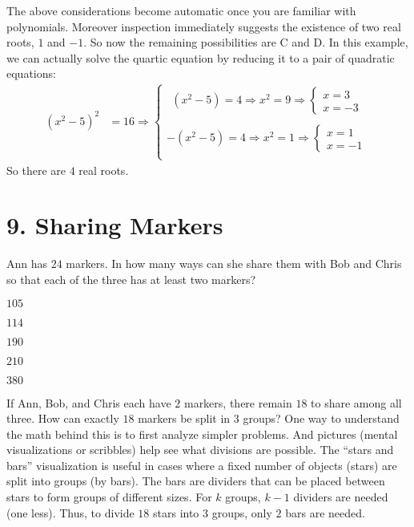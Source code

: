\documentclass[12pt]{article}
\begin{document}
The above considerations become automatic once you are familiar with polynomials. Moreover inspection immediately suggests the existence of two real roots, $1$ and $-1$. So now the remaining possibilities are C and D. 
In this example, we can actually solve the quartic equation by reducing it to a pair of quadratic equations: 
\begin{align*}
(x^2-5)^2 & = 16 
\Longrightarrow
  \begin{cases}
  ~~(x^2-5) = 4 
    \Rightarrow x^2 = 9
      \Rightarrow 
        \begin{cases}
        x = 3 \\
        x = -3
        \end{cases} \\ \\
  -(x^2-5) = 4 
    \Rightarrow x^2 = 1
      \Rightarrow 
        \begin{cases}
        x = 1 \\
        x = -1
        \end{cases} \\
  \end{cases} 
\end{align*}
So there are $4$ real roots. 




\newpage
\section*{9. Sharing Markers}
\begin{question}
Ann has $24$ markers. In how many ways can she share them with Bob and Chris so that each of the three has at least two markers?
\begin{enumerate*}
  \item $105$
  \item $114$
  \item $190$
  \item $210$
  \item $380$
\end{enumerate*}
\end{question}

If Ann, Bob, and Chris each have $2$ markers, there remain $18$ to share among all three. How can exactly $18$ markers be split in $3$ groups? One way to understand the math behind this is to first analyze simpler problems. And pictures (mental visualizations or scribbles) help see what divisions are possible. The ``stars and bars'' visualization is useful in cases where a fixed number of objects (stars) are split into groups (by bars). The bars are dividers that can be placed between stars to form groups of different sizes. For $k$ groups, $k-1$ dividers are needed (one less). Thus, to divide $18$ stars into $3$ groups, only $2$ bars are needed.  
\end{document}
